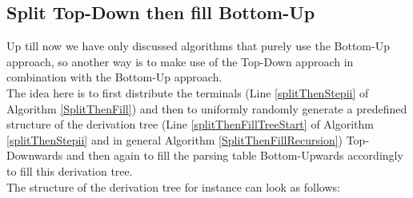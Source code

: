 \pagebreak
\subsection{Split Top-Down then fill Bottom-Up}
Up till now we have only discussed algorithms that purely use the Bottom-Up approach, so another way is to make use of the Top-Down approach in combination with the Bottom-Up approach.\\
The idea here is to first distribute the terminals (Line \ref{splitThenStepii} of Algorithm \ref{SplitThenFill}) and then to uniformly randomly generate a predefined structure of the derivation tree (Line \ref{splitThenFillTreeStart} of Algorithm \ref{splitThenStepii} and in general Algorithm \ref{SplitThenFillRecursion}) Top-Downwards and then again to fill the parsing table Bottom-Upwards accordingly to fill this derivation tree. \\
The structure of the derivation tree for instance can look as follows:

